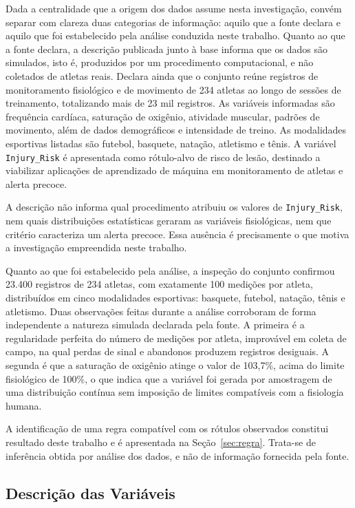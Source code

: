 Dada a centralidade que a origem dos dados assume nesta investigação, convém separar com clareza duas categorias de informação: aquilo que a fonte declara e aquilo que foi estabelecido pela análise conduzida neste trabalho. Quanto ao que a fonte declara, a descrição publicada junto à base informa que os dados são simulados, isto é, produzidos por um procedimento computacional, e não coletados de atletas reais. Declara ainda que o conjunto reúne registros de monitoramento fisiológico e de movimento de 234 atletas ao longo de sessões de treinamento, totalizando mais de 23 mil registros. As variáveis informadas são frequência cardíaca, saturação de oxigênio, atividade muscular, padrões de movimento, além de dados demográficos e intensidade de treino. As modalidades esportivas listadas são futebol, basquete, natação, atletismo e tênis. A variável \texttt{Injury\_Risk} é apresentada como rótulo-alvo de risco de lesão, destinado a viabilizar aplicações de aprendizado de máquina em monitoramento de atletas e alerta precoce.

A descrição não informa qual procedimento atribuiu os valores de \texttt{Injury\_Risk}, nem quais distribuições estatísticas geraram as variáveis fisiológicas, nem que critério caracteriza um alerta precoce. Essa ausência é precisamente o que motiva a investigação empreendida neste trabalho.

Quanto ao que foi estabelecido pela análise, a inspeção do conjunto confirmou 23.400 registros de 234 atletas, com exatamente 100 medições por atleta, distribuídos em cinco modalidades esportivas: basquete, futebol, natação, tênis e atletismo. Duas observações feitas durante a análise corroboram de forma independente a natureza simulada declarada pela fonte. A primeira é a regularidade perfeita do número de medições por atleta, improvável em coleta de campo, na qual perdas de sinal e abandonos produzem registros desiguais. A segunda é que a saturação de oxigênio atinge o valor de 103{,}7\%, acima do limite fisiológico de 100\%, o que indica que a variável foi gerada por amostragem de uma distribuição contínua sem imposição de limites compatíveis com a fisiologia humana.

A identificação de uma regra compatível com os rótulos observados constitui resultado deste trabalho e é apresentada na Seção~\ref{sec:regra}. Trata-se de inferência obtida por análise dos dados, e não de informação fornecida pela fonte.

\subsection{Descrição das Variáveis}

